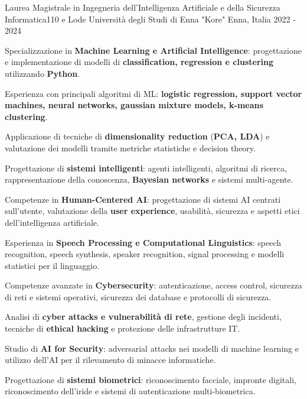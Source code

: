 
\begin{cventries}

  \cventry
    {Laurea Magistrale in Ingegneria dell'Intelligenza Artificiale e della Sicurezza Informatica{\enskip\cdotp\enskip}110 e Lode}
    {Università degli Studi di Enna "Kore"}
    {Enna, Italia}
    {2022 - 2024}
    {
      \begin{cvitems}
        \item {Specializzazione in \textbf{Machine Learning e Artificial Intelligence}: progettazione e implementazione di modelli di \textbf{classification, regression e clustering} utilizzando \textbf{Python}.}
        \item {Esperienza con principali algoritmi di ML: \textbf{logistic regression, support vector machines, neural networks, gaussian mixture models, k-means clustering}.}
        \item {Applicazione di tecniche di \textbf{dimensionality reduction} (\textbf{PCA, LDA}) e valutazione dei modelli tramite metriche statistiche e decision theory.}
        \item {Progettazione di \textbf{sistemi intelligenti}: agenti intelligenti, algoritmi di ricerca, rappresentazione della conoscenza, \textbf{Bayesian networks} e sistemi multi-agente.}
        \item {Competenze in \textbf{Human-Centered AI}: progettazione di sistemi AI centrati sull’utente, valutazione della \textbf{user experience}, usabilità, sicurezza e aspetti etici dell’intelligenza artificiale.}
        \item {Esperienza in \textbf{Speech Processing e Computational Linguistics}: speech recognition, speech synthesis, speaker recognition, signal processing e modelli statistici per il linguaggio.}
        \item {Competenze avanzate in \textbf{Cybersecurity}: autenticazione, access control, sicurezza di reti e sistemi operativi, sicurezza dei database e protocolli di sicurezza.}
        \item {Analisi di \textbf{cyber attacks e vulnerabilità di rete}, gestione degli incidenti, tecniche di \textbf{ethical hacking} e protezione delle infrastrutture IT.}
        \item {Studio di \textbf{AI for Security}: adversarial attacks nei modelli di machine learning e utilizzo dell’AI per il rilevamento di minacce informatiche.}
        \item {Progettazione di \textbf{sistemi biometrici}: riconoscimento facciale, impronte digitali, riconoscimento dell’iride e sistemi di autenticazione multi-biometrica.}
      \end{cvitems}
    }


\end{cventries}
